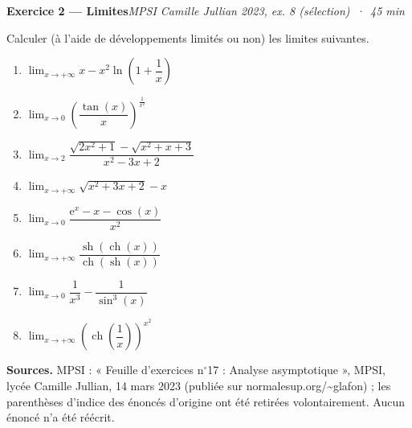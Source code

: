 \documentclass[11pt,a4paper]{article}
\newcommand{\sh}{\operatorname{sh}}
\newcommand{\ch}{\operatorname{ch}}
\newcommand{\ee}{\mathrm{e}}
\newcommand{\exo}[3]{\vspace{1.1em}\noindent\textbf{\large #1}\hfill\textit{#2 \,·\, #3}\par\smallskip}
\begin{document}
\exo{Exercice 2 — Limites}{MPSI Camille Jullian 2023, ex. 8 (sélection)}{45 min}
\noindent Calculer (à l'aide de développements limités ou non) les limites suivantes.
\begin{enumerate}[label=\arabic*.,itemsep=0.45em,leftmargin=*]
\item $\displaystyle\lim_{x\to+\infty}x-x^2\ln\!\left(1+\dfrac1x\right)$
\item $\displaystyle\lim_{x\to 0}\left(\dfrac{\tan(x)}{x}\right)^{\frac{1}{x^2}}$
\item $\displaystyle\lim_{x\to 2}\dfrac{\sqrt{2x^2+1}-\sqrt{x^2+x+3}}{x^2-3x+2}$
\item $\displaystyle\lim_{x\to+\infty}\sqrt{x^2+3x+2}-x$
\item $\displaystyle\lim_{x\to 0}\dfrac{\ee^x-x-\cos(x)}{x^2}$
\item $\displaystyle\lim_{x\to+\infty}\dfrac{\sh(\ch(x))}{\ch(\sh(x))}$
\item $\displaystyle\lim_{x\to 0}\dfrac{1}{x^3}-\dfrac{1}{\sin^3(x)}$
\item $\displaystyle\lim_{x\to+\infty}\left(\ch\!\left(\dfrac1x\right)\right)^{x^2}$
\end{enumerate}

\vfill
\begin{small}
\noindent\textbf{Sources.} MPSI : « Feuille d'exercices n$^{\circ}$17 : Analyse asymptotique », MPSI, lycée Camille Jullian, 14 mars 2023 (publiée sur normalesup.org/\textasciitilde glafon) ; les parenthèses d'indice des énoncés d'origine ont été retirées volontairement. Aucun énoncé n'a été réécrit.
\end{small}
\end{document}
